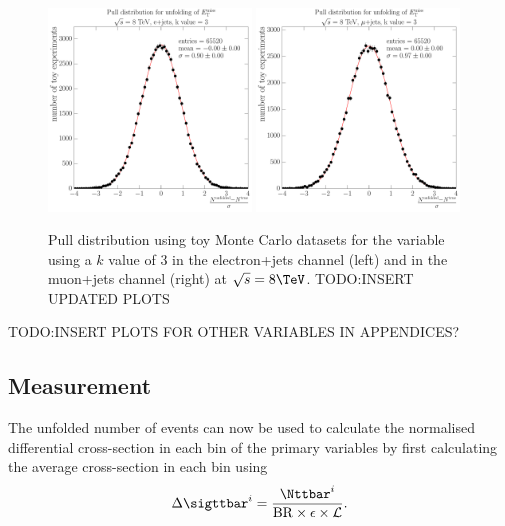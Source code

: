 \begin{figure}[hbtp]
    \centering
     \includegraphics[width=0.48\textwidth]{Chapters/04_Analysis/04b_XSections/images/unfolding_pulls/8TeV/MET/electron/kv3/pull_from_files_all_bins_stats_65520.pdf}\hfill
     \includegraphics[width=0.48\textwidth]{Chapters/04_Analysis/04b_XSections/images/unfolding_pulls/8TeV/MET/muon/kv3/pull_from_files_all_bins_stats_65520.pdf}\\
	 \caption{Pull distribution using toy Monte Carlo datasets for the \met variable using a $k$ value of 3 in
	 the electron+jets channel (left) and in the muon+jets channel (right) at $\sqrt{s}=8\TeV$.
	 TODO:INSERT UPDATED PLOTS} %
     \label{fig:unfolding_pull_tests}
\end{figure}

TODO:INSERT PLOTS FOR OTHER VARIABLES IN APPENDICES?

\subsection{Measurement}
\label{ss:measurement}

The unfolded number of \ttbar events can now be used to calculate the normalised differential cross-section in
each bin of the primary variables by first calculating the average cross-section in each bin using
\begin{equation}
\label{eq:finll_1}
\Delta\sigttbar^i = \frac{\Nttbar^i}{\mathrm{BR} \times \epsilon \times {\cal L}}. 
\end{equation}

